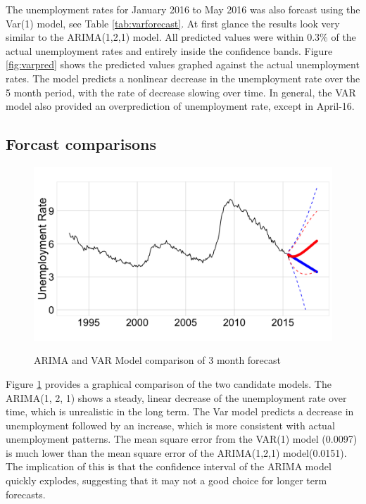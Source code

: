 \documentclass[twoside,twocolumn]{article}
\begin{document}
The unemployment rates for January 2016 to May 2016 was also forcast using the Var(1) model, see Table \ref{tab:varforecast}.  At first glance the results look very similar to the ARIMA(1,2,1) model. All predicted values were within 0.3\% of the actual unemployment rates and entirely inside the confidence bands.  Figure \ref{fig:varpred} shows the predicted values graphed against the actual unemployment rates. The model predicts a nonlinear decrease in the unemployment rate over the 5 month period, with the rate of decrease slowing over time.  In general, the VAR model also provided an overprediction of unemployment rate, except in April-16. 

 \subsection{Forcast comparisons}
    \begin{figure}[htb]
    	\centering
     	\caption{ARIMA and VAR Model comparison of 3 month forecast}
     	\includegraphics[width=\linewidth]{images/arimavarforecast}
     	\label{fig:arimavarforecast}
 \end{figure}
 
 
      Figure \ref{fig:arimavarforecast} provides a graphical comparison of the two candidate models.  The ARIMA(1, 2, 1) shows a steady, linear decrease of the unemployment rate over time, which is unrealistic in the long term.  The Var model predicts a decrease in unemployment followed by an increase, which is more consistent with actual unemployment patterns. The mean square error from the VAR(1) model (0.0097) is much lower than the mean square error of the ARIMA(1,2,1) model(0.0151). The implication of this is that  the confidence interval of the ARIMA model quickly explodes, suggesting that it may not a good choice for longer term forecasts.
      
\end{document}
